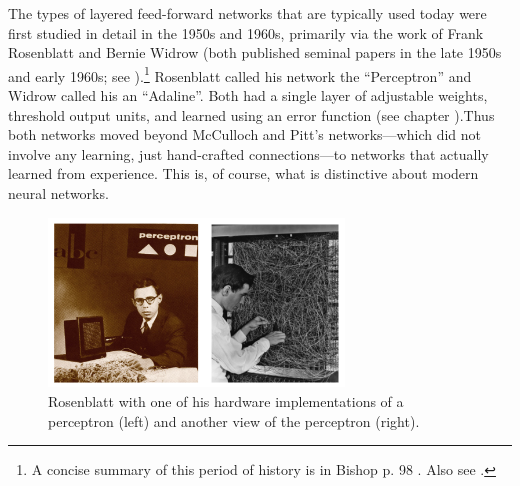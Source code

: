 The types of layered feed-forward networks that  are typically used today were first studied in detail in the 1950s and 1960s, primarily via the work of Frank Rosenblatt and Bernie Widrow (both published seminal papers in the late 1950s and early 1960s; see \cite{widrow1960adaptive}).\footnote{A concise summary of this period of history is in Bishop p. 98 \cite{bishop1995neural}. Also see \cite{widrow1960adaptive}.}  Rosenblatt called his network the ``Perceptron'' and Widrow called his an ``Adaline''. Both had a single layer of adjustable weights, threshold output units, and learned using an error function (see chapter ).Thus both networks moved beyond McCulloch and Pitt's networks---which did not involve any learning, just hand-crafted connections---to networks that actually learned from experience. This is, of course, what is distinctive about modern neural networks.

\begin{figure}[h]
\centering
\includegraphics[width=0.7\textwidth]{images/perceptron.png}
\caption[Left: \url{http://www.rutherfordjournal.org/images/TAHC_rosenblatt-sepia.jpg}; Right: \url{http://www.newyorker.com/wp-content/uploads/2012/11/frank-rosenblatt-perception.jpg}]{Rosenblatt with one of his hardware implementations of a perceptron (left) and another view of the perceptron (right). }
\label{perceptron}
\end{figure}


